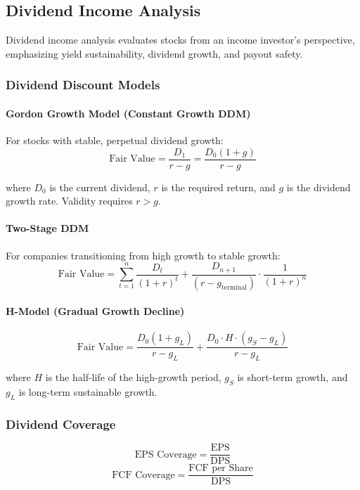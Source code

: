 \newpage\subsection{Dividend Income Analysis}

Dividend income analysis evaluates stocks from an income investor's perspective, emphasizing yield sustainability, dividend growth, and payout safety.

\subsubsection{Dividend Discount Models}

\paragraph{Gordon Growth Model (Constant Growth DDM)}

For stocks with stable, perpetual dividend growth:
\[
\text{Fair Value} = \frac{D_1}{r - g} = \frac{D_0 (1 + g)}{r - g}
\]

where $D_0$ is the current dividend, $r$ is the required return, and $g$ is the dividend growth rate. Validity requires $r > g$.

\paragraph{Two-Stage DDM}

For companies transitioning from high growth to stable growth:
\[
\text{Fair Value} = \sum_{t=1}^{n} \frac{D_t}{(1+r)^t} + \frac{D_{n+1}}{(r - g_{\text{terminal}})} \cdot \frac{1}{(1+r)^n}
\]

\paragraph{H-Model (Gradual Growth Decline)}
\[
\text{Fair Value} = \frac{D_0 (1 + g_L)}{r - g_L} + \frac{D_0 \cdot H \cdot (g_S - g_L)}{r - g_L}
\]

where $H$ is the half-life of the high-growth period, $g_S$ is short-term growth, and $g_L$ is long-term sustainable growth.

\subsubsection{Dividend Coverage}

\[
\text{EPS Coverage} = \frac{\text{EPS}}{\text{DPS}}
\]
\[
\text{FCF Coverage} = \frac{\text{FCF per Share}}{\text{DPS}}
\]

